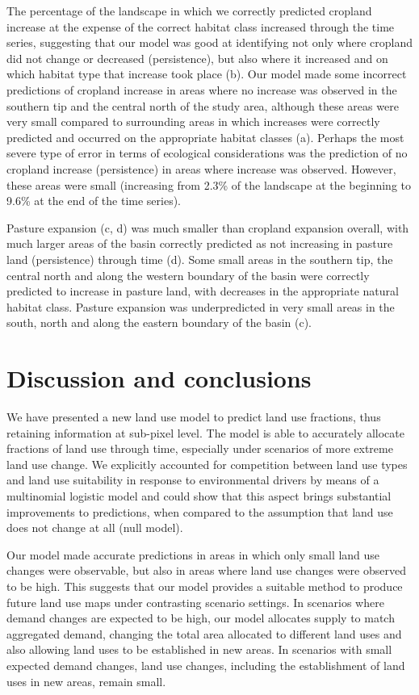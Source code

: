 \documentclass[titlesmallcaps,copyrightpage]{uomthesis}\usepackage[]{graphicx}\usepackage[]{color}
\begin{document}
The percentage of the landscape in which we correctly predicted cropland
increase at the expense of the correct habitat class increased through
the time series, suggesting that our model was good at identifying not
only where cropland did not change or decreased (persistence), but also
where it increased and on which habitat type that increase took place
(b). Our model made some incorrect predictions of
cropland increase in areas where no increase was observed in the
southern tip and the central north of the study area, although these
areas were very small compared to surrounding areas in which increases
were correctly predicted and occurred on the appropriate habitat classes
(a). Perhaps the most severe type of error in
terms of ecological considerations was the prediction of no cropland
increase (persistence) in areas where increase was observed. However,
these areas were small (increasing from 2.3\% of the landscape at the
beginning to 9.6\% at the end of the time series).

Pasture expansion (c, d) was much smaller than
cropland expansion overall, with much larger areas of the basin
correctly predicted as not increasing in pasture land (persistence)
through time (d). Some small areas in the
southern tip, the central north and along the western boundary of the
basin were correctly predicted to increase in pasture land, with
decreases in the appropriate natural habitat class. Pasture expansion
was underpredicted in very small areas in the south, north and along the
eastern boundary of the basin (c).

\section{Discussion and conclusions}

We have presented a new land use model to predict land use fractions,
thus retaining information at sub-pixel level. The model is able to
accurately allocate fractions of land use through time, especially under
scenarios of more extreme land use change. We explicitly accounted for
competition between land use types and land use suitability in response
to environmental drivers by means of a multinomial logistic model and
could show that this aspect brings substantial improvements to
predictions, when compared to the assumption that land use does not
change at all (null model).

Our model made accurate predictions in areas in which only small land
use changes were observable, but also in areas where land use changes
were observed to be high. This suggests that our model provides a
suitable method to produce future land use maps under contrasting
scenario settings. In scenarios where demand changes are expected to be
high, our model allocates supply to match aggregated demand, changing
the total area allocated to different land uses and also allowing land
uses to be established in new areas. In scenarios with small expected
demand changes, land use changes, including the establishment of land
uses in new areas, remain small.
\end{document}
